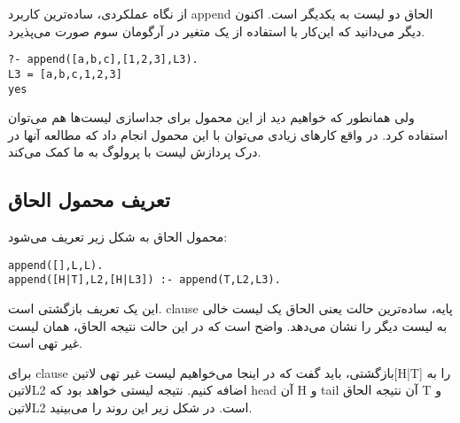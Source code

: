 از نگاه عملکردی، ساده‌ترین کاربرد append الحاق دو لیست به یکدیگر است. اکنون دیگر می‌دانید که این‌کار با استفاده از یک متغیر در آرگومان سوم صورت می‌پذیرد.
\begin{latin}
\begin{lstlisting}
?- append([a,b,c],[1,2,3],L3).
L3 = [a,b,c,1,2,3]
yes
\end{lstlisting}
\end{latin}
ولی همانطور که خواهیم دید از این محمول برای جداسازی لیست‌ها هم می‌توان استفاده کرد. در واقع کارهای زیادی می‌توان با این محمول انجام داد که مطالعه آنها در درک پردازش لیست با پرولوگ به ما کمک می‌کند.

\subsection{تعریف محمول الحاق}
محمول الحاق به شکل زیر تعریف می‌شود:
\begin{latin}
\begin{lstlisting}
append([],L,L).
append([H|T],L2,[H|L3]) :- append(T,L2,L3).
\end{lstlisting}
\end{latin}
این یک تعریف بازگشتی است. clause پایه، ساده‌ترین حالت یعنی الحاق یک لیست خالی به لیست دیگر را نشان می‌دهد. واضح است که در این حالت نتیجه الحاق، همان لیست غیر تهی است.

برای clause بازگشتی، باید گفت که در اینجا می‌خواهیم لیست غیر تهی ‌لاتین{[H|T]} را به ‌لاتین{L2} اضافه کنیم. نتیجه لیستی خواهد بود که head آن H و tail آن نتیجه الحاق T و ‌لاتین{L2} است. در شکل زیر این روند را می‌بینید.

\begin{latin}
\end{latin}

